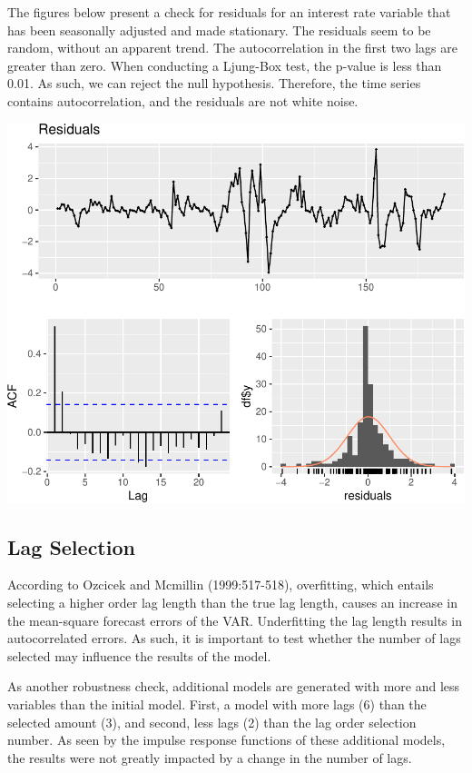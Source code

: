 \documentclass[11pt,preprint, authoryear]{elsarticle}
\numberwithin{equation}{section}
\numberwithin{figure}{section}
\numberwithin{table}{section}
\begin{document}
\newpage

The figures below present a check for residuals for an interest rate
variable that has been seasonally adjusted and made stationary. The
residuals seem to be random, without an apparent trend. The
autocorrelation in the first two lags are greater than zero. When
conducting a Ljung-Box test, the p-value is less than 0.01. As such, we
can reject the null hypothesis. Therefore, the time series contains
autocorrelation, and the residuals are not white noise.

\includegraphics{TS_proj_files/figure-latex/unnamed-chunk-27-1.pdf}

\newpage

\hypertarget{lag-selection}{%
\subsection{Lag Selection}\label{lag-selection}}

According to Ozcicek and Mcmillin (1999:517-518), overfitting, which
entails selecting a higher order lag length than the true lag length,
causes an increase in the mean-square forecast errors of the VAR.
Underfitting the lag length results in autocorrelated errors. As such,
it is important to test whether the number of lags selected may
influence the results of the model.

As another robustness check, additional models are generated with more
and less variables than the initial model. First, a model with more lags
(6) than the selected amount (3), and second, less lags (2) than the lag
order selection number. As seen by the impulse response functions of
these additional models, the results were not greatly impacted by a
change in the number of lags.
\end{document}
